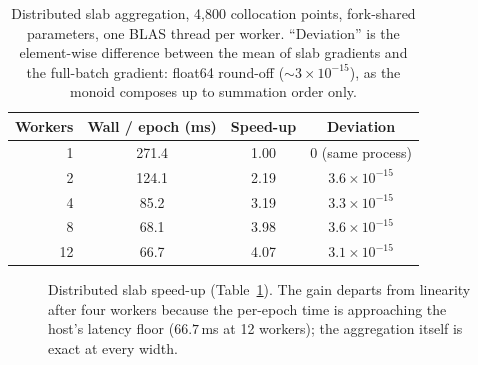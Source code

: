 \documentclass[11pt,a4paper]{article}
\theoremstyle{plain}
\theoremstyle{definition}
\begin{document}
\begin{table}[h]
\centering
\caption{Distributed slab aggregation, 4{,}800 collocation points,
fork-shared parameters, one BLAS thread per worker. ``Deviation'' is the
element-wise difference between the mean of slab gradients and the
full-batch gradient: float64 round-off ($\sim3\times10^{-15}$), as the
monoid composes up to summation order only.}
\begin{tabular}{rccc}
\toprule
\textbf{Workers} & \textbf{Wall / epoch (ms)} & \textbf{Speed-up} &
\textbf{Deviation} \\
\midrule
1  & 271.4 & 1.00 & $0$ (same process) \\
2  & 124.1 & 2.19 & $3.6\times10^{-15}$ \\
4  & 85.2  & 3.19 & $3.3\times10^{-15}$ \\
8  & 68.1  & 3.98 & $3.6\times10^{-15}$ \\
12 & 66.7  & 4.07 & $3.1\times10^{-15}$ \\
\bottomrule
\end{tabular}
\label{tab:case-dist}
\end{table}

\begin{figure}[h]
\centering
{}
\caption{Distributed slab speed-up (Table~\protect\ref{tab:case-dist}). The gain
departs from linearity after four workers because the per-epoch time is
approaching the host's latency floor ($66.7$\,ms at 12 workers); the
aggregation itself is exact at every width.}
\label{fig:slabspeedup}
\end{figure}
\end{document}
